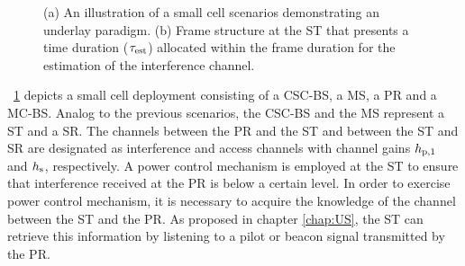 \begin{figure}
	\centering
	\caption{(a) An illustration of a small cell scenarios demonstrating an underlay paradigm. (b) Frame structure at the ST that presents a time duration ($\tau_{\text{est}}$) allocated within the frame duration for the estimation of the interference channel.} 
	\label{szenarioA}
\end{figure}



\figurename~\ref{szenarioA} depicts a small cell deployment consisting of a CSC-BS, a MS, a PR and a MC-BS. Analog to the previous scenarios, the CSC-BS and the MS represent a ST and a SR. The channels between the PR and the ST and between the ST and SR are designated as interference and access channels with channel gains $h_{\text{p,1}}$ and $h_{\text{s}}$, respectively. A power control mechanism is employed at the ST to ensure that interference received at the PR is below a certain level. In order to exercise power control mechanism, it is necessary to acquire the knowledge of the channel between the ST and the PR. As proposed in chapter \ref{chap:US}, the ST can retrieve this information by listening to a pilot or beacon signal transmitted by the PR. %


